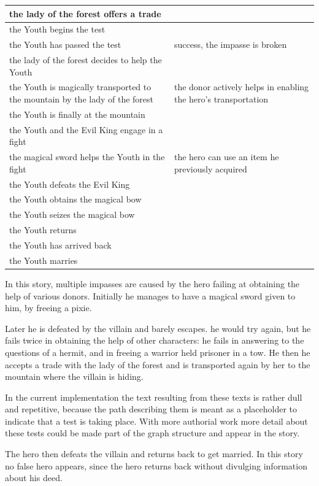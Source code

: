 \documentclass[12pt,a4paper,oneside]{report}
\begin{document}
\begin{longtable}[H]{| p{} | p{} |}
\hline
the lady of the forest offers a trade  & \\ 
\hline
the Youth begins the test  & \\ 
\hline
the Youth has passed the test  & success, the impasse is broken\\ 
\hline
the lady of the forest decides to help the Youth  & \\ 
\hline
the Youth is magically transported to the mountain by the lady of the forest & the donor actively helps in enabling the hero's transportation\\ 
\hline
the Youth is finally at the mountain  & \\ 
\hline
the Youth and the Evil King engage in a fight & \\ 
\hline
the magical sword helps the Youth in the fight & the hero can use an item he previously acquired\\ 
\hline
the Youth defeats the Evil King  & \\ 
\hline
the Youth obtains the magical bow & \\ 
\hline
the Youth seizes the magical bow  & \\ 
\hline
the Youth returns  & \\ 
\hline
the Youth has arrived back & \\ 
\hline
the Youth marries & \\ 
\hline
\end{longtable}

In this story, multiple impasses are caused by the hero failing at obtaining the help of various donors. Initially he manages to have a magical sword given to him, by freeing a pixie.

Later he is defeated by the villain and barely escapes. he would try again, but he fails twice in obtaining the help of other characters: he fails in answering to the questions of a hermit, and in freeing a warrior held prisoner in a tow. He then he accepts a trade with the lady of the forest and is transported again by her to the mountain where the villain is hiding. 

\bigskip

In the current implementation the text resulting from these texts is rather dull and repetitive, because the path describing them is meant as a placeholder to indicate that a test is taking place. With more authorial work more detail about these tests could be made part of the graph structure and appear in the story.

\bigskip

The hero then defeats the villain and returns back to get married. In this story no false hero appears, since the hero returns back without divulging information about his deed.



\printbibliography
\end{document}
